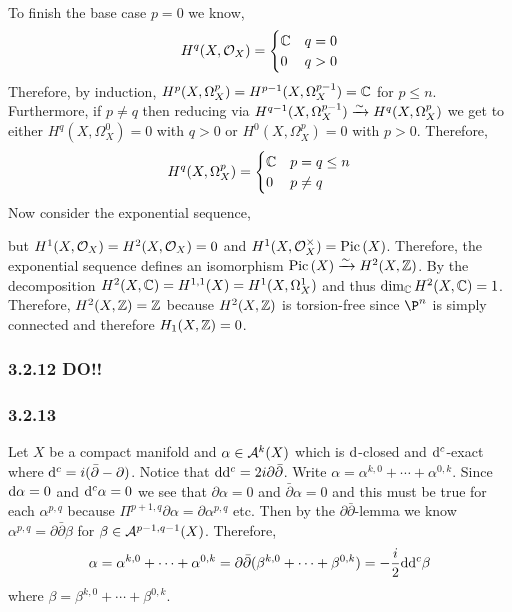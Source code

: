 \documentclass[12pt]{article}
\begin{document}
\bigskip\\
To finish the base case $p = 0$ we know,
\[ H^q(X, \mathcal{O}_{X}) = 
\begin{cases}
\mathbb{C} & q = 0
\\
0 & q > 0
\end{cases} \]
Therefore, by induction, $H^p(X, \Omega_X^p) = H^{p-1}(X, \Omega_X^{p-1}) = \mathbb{C}$ for $p \le n$. Furthermore, if $p \neq q$ then reducing via $H^{q-1}(X, \Omega^{p-1}_{X}) \xrightarrow{\sim} H^q(X, \Omega^p_{X})$ we get to either $H^q(X, \Omega^0_X) = 0$ with $q > 0$ or $H^0(X, \Omega^p_X) = 0$ with $p > 0$. Therefore,
\[ H^q(X, \Omega^p_X) = 
\begin{cases}
\mathbb{C} & p = q \le n
\\
0 & p \neq q
\end{cases} \]
Now consider the exponential sequence,
\begin{center}
\end{center}
but $H^1(X, \mathcal{O}_{X}) = H^2(X, \mathcal{O}_{X}) = 0$ and $H^1(X, \mathcal{O}_{X}^\times) = \mathrm{Pic} \left( X \right)$. Therefore, the exponential sequence defines an isomorphism $\mathrm{Pic} \left( X \right) \xrightarrow{\sim} H^2(X, \mathbb{Z})$. By the \kahler decomposition $H^2(X, \mathbb{C}) = H^{1,1}(X) = H^1(X, \Omega^1_X)$ and thus $\dim_{\mathbb{C}} H^2(X, \mathbb{C}) = 1$. Therefore, $H^2(X, \mathbb{Z}) = \mathbb{Z}$ because $H^2(X, \mathbb{Z})$ is torsion-free since $\P^n$ is simply connected and therefore $H_1(X, \mathbb{Z}) = 0$.

\subsubsection{3.2.12 DO!!}

\subsubsection{3.2.13}

Let $X$ be a compact \kahler manifold and $\alpha \in \mathcal{A}^k(X)$ which is $\mathrm{d}$-closed and $\mathrm{d}^c$-exact where $\mathrm{d}^c = i (\bar{\partial} - \partial)$. Notice that $\mathrm{d} \mathrm{d}^c = 2 i \partial \bar{\partial}$. Write $\alpha = \alpha^{k, 0} + \cdots + \alpha^{0, k}$. Since $\mathrm{d}{\alpha} = 0$ and $\mathrm{d}^c{\alpha} = 0$ we see that $\partial \alpha = 0$ and $\bar{\partial} \alpha = 0$ and this must be true for each $\alpha^{p,q}$ because $\Pi^{p+1,q} \partial \alpha = \partial \alpha^{p,q}$ etc. Then by the $\partial \bar{\partial}$-lemma we know $\alpha^{p,q} = \partial \bar{\partial} \beta$ for $\beta \in \mathcal{A}^{p-1,q-1}(X)$. Therefore, 
\[ \alpha = \alpha^{k, 0} + \cdots + \alpha^{0, k} = \partial \bar{\partial} (\beta^{k, 0} + \cdots + \beta^{0, k}) = - \frac{i}{2} \mathrm{d} \mathrm{d}^c \beta \]
where $\beta = \beta^{k, 0} + \cdots + \beta^{0, k}$. 
\end{document}
